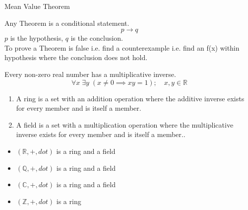 \documentclass[a4paper, 12pt]{article}
\newenvironment{definition}[1][Definition]{\begin{trivlist}
\item[\hskip \labelsep {\bfseries #1}]}{\end{trivlist}}
\newenvironment{example}[1][Example]{\begin{trivlist}
\item[\hskip \labelsep {\bfseries #1}]}{\end{trivlist}}
\begin{document}
    \begin{example}
        Mean Value Theorem
    \end{example}
    Any Theorem is a conditional statement.
    \[p \rightarrow q\]
    $p$ is the hypothesis, $q$ is the conclusion.\\
    To prove a Theorem is false i.e. find a counterexample i.e. find an f(x) within
    hypothesis where the conclusion does not hold.
    \begin{example}
        Every non-zero real number has a multiplicative inverse.
        \[\forall x \; \exists y \; (x \ne 0 \implies xy = 1); \quad
        x, y \in \mathbb{R}\]
        \begin{definition}
            \hfill
            \begin{enumerate}
                \item A ring is a set with an addition operation where the additive inverse
                exists for every member and is itself a member.
                \item A field is a set with a multiplication operation where the
                multiplicative inverse exists for every member and is itself a member..
            \end{enumerate}
        \end{definition}
        \begin{itemize}
            \item $(\mathbb{R}, +, dot)$ is a ring and a field
            \item $(\mathbb{Q}, +, dot)$ is a ring and a field
            \item $(\mathbb{C}, +, dot)$ is a ring and a field
            \item $(\mathbb{Z}, +, dot)$ is a ring
        \end{itemize}
    \end{example}
\end{document}
